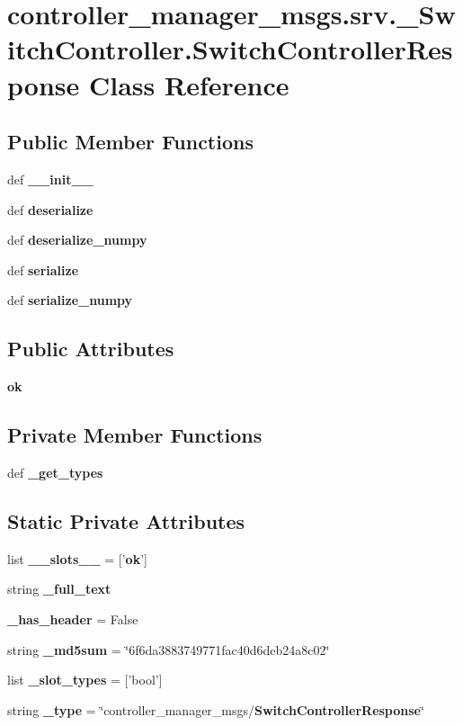 \section{controller\-\_\-manager\-\_\-msgs.\-srv.\-\_\-\-Switch\-Controller.\-Switch\-Controller\-Response \-Class \-Reference}
\label{classcontroller__manager__msgs_1_1srv_1_1__SwitchController_1_1SwitchControllerResponse}
\subsection*{\-Public \-Member \-Functions}
\begin{DoxyCompactItemize}
\item 
def {\bf \-\_\-\-\_\-init\-\_\-\-\_\-}
\item 
def {\bf deserialize}
\item 
def {\bf deserialize\-\_\-numpy}
\item 
def {\bf serialize}
\item 
def {\bf serialize\-\_\-numpy}
\end{DoxyCompactItemize}
\subsection*{\-Public \-Attributes}
\begin{DoxyCompactItemize}
\item 
{\bf ok}
\end{DoxyCompactItemize}
\subsection*{\-Private \-Member \-Functions}
\begin{DoxyCompactItemize}
\item 
def {\bf \-\_\-get\-\_\-types}
\end{DoxyCompactItemize}
\subsection*{\-Static \-Private \-Attributes}
\begin{DoxyCompactItemize}
\item 
list {\bf \-\_\-\-\_\-slots\-\_\-\-\_\-} = ['{\bf ok}']
\item 
string {\bf \-\_\-full\-\_\-text}
\item 
{\bf \-\_\-has\-\_\-header} = \-False
\item 
string {\bf \-\_\-md5sum} = \char`\"{}6f6da3883749771fac40d6deb24a8c02\char`\"{}
\item 
list {\bf \-\_\-slot\-\_\-types} = ['bool']
\item 
string {\bf \-\_\-type} = \char`\"{}controller\-\_\-manager\-\_\-msgs/{\bf \-Switch\-Controller\-Response}\char`\"{}
\end{DoxyCompactItemize}


